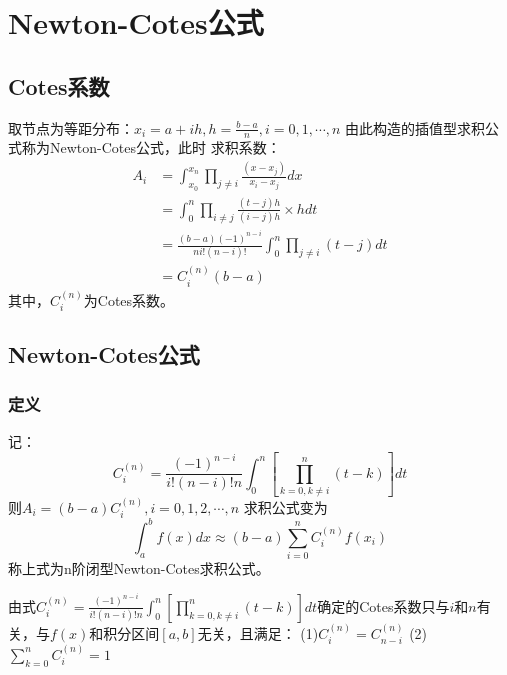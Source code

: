 \section{Newton-Cotes公式}

\subsection{Cotes系数}
取节点为等距分布：$x_i=a+ih, h=\frac{b-a}{n}, i=0,1,\cdots,n$
由此构造的插值型求积公式称为Newton-Cotes公式，此时
求积系数：
\begin{align*}%
    A_i &= \int_{x_0}^{x_n}\prod_{j\neq i}\frac{(x-x_j)}{x_i-x_j}dx \\
    &=\int_{0}^{n}\prod_{i\neq j}\frac{(t-j)h}{(i-j)h}\times hdt \\
    &= \frac{(b-a)(-1)^{n-i}}{ni!(n-i)!}\int_{0}^{n}\prod_{j\neq i}(t-j)dt\\
    &= C_i^{(n)}(b-a)
\end{align*}
其中，$C_i^{(n)}$为Cotes系数。

\subsection{Newton-Cotes公式}

\subsubsection{定义}

\begin{definition}
    记：
    \begin{equation*}
        C_i^(n) = \frac{(-1)^{n-i}}{i!(n-i)!n}\int_{0}^{n}[\prod_{k=0,k\neq i}^{n}(t-k)]dt
    \end{equation*}
    则$A_i = (b-a)C_i^{(n)},i=0,1,2,\cdots,n$
    求积公式变为
    \begin{equation*}
        \int_{a}^{b}f(x)dx \approx (b-a)\sum_{i=0}^{n}C_i^{(n)}f(x_i)
    \end{equation*}
    称上式为n阶闭型Newton-Cotes求积公式。
\end{definition}

\begin{remark}
    由式$C_i^{(n)} = \frac{(-1)^{n-i}}{i!(n-i)!n}\int_{0}^{n}[\prod_{k=0,k\neq i}^{n}(t-k)]dt$确定的Cotes系数只与$i$和$n$有关，与$f(x)$和积分区间$[a,b]$无关，且满足：
    (1)$C_i^{(n)} = C_{n-i}^{(n)}$
    (2)$\sum_{k=0}^{n}C_i^{(n)} = 1$
\end{remark}

